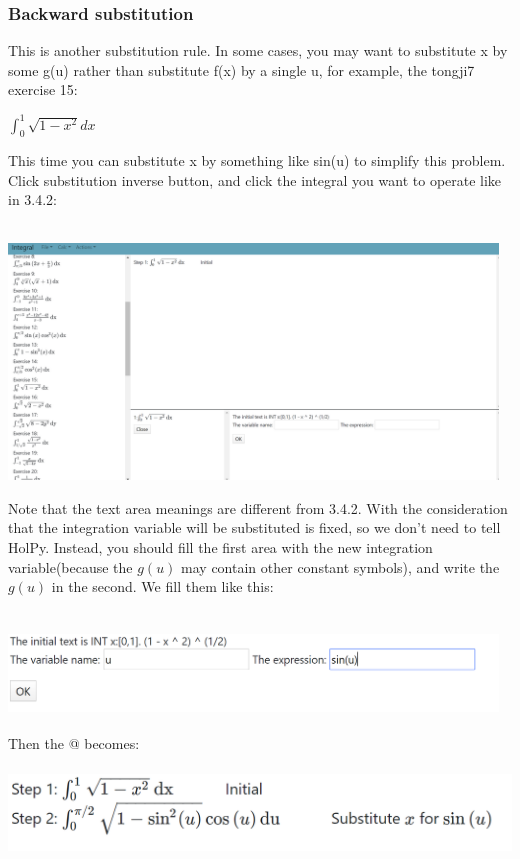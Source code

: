 \documentclass[titlepage]{article}
\makeatletter
\newcommand*{\rom}[1]{\expandafter\@slowromancap\romannumeral #1@}
\makeatother
\begin{document}
\subsubsection{Backward substitution}
This is another substitution rule. In some cases, you may want to substitute x by some g(u) rather than substitute f(x) by a single u, for example, the tongji7 exercise 15:
\begin{center}
$\int_{0}^{1} \sqrt{1 - x^2} dx$
\end{center}
This time you can substitute x by something like sin(u) to simplify this problem. Click \colorbox{mygray}{substitution inverse} button, and click the integral you want to operate like in 3.4.2:\\\\
\includegraphics[width=13cm, height=7cm]{12.png}
Note that the text area meanings are different from 3.4.2. With the consideration that the integration variable will be substituted is fixed, so we don't need to tell HolPy. Instead, you should fill the first area with the new integration variable(because the $g(u)$ may contain other constant symbols), and write the $g(u)$ in the second. We fill them like this:\\\\
\includegraphics[width=13cm, height=3cm]{13.png}
Then the \rom{3} becomes:\\\\
\includegraphics{30.png}
\end{document}
